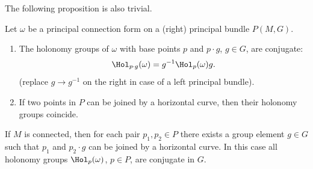 The following proposition is also trivial.
\begin{prop}[{{\cite[Prop.~1.7.8]{RS2}}}]\label{prop 1.7.8 RS2}
    Let $\omega$ be a principal connection form on a (right) principal bundle $P(M,G)$. 
    \begin{enumerate}
        \item The holonomy groups of $\omega$ with base points $p$ and $p\cdot g$, $g\in G$, are conjugate:
        \[\Hol_{p\cdot g}(\omega)=g^{-1}\Hol_{p}(\omega)g.\]
        (replace $g\to g^{-1}$ on the right in case of a left principal bundle).

        \item If two points in $P$ can be joined by a horizontal curve, then their holonomy groups coincide.
    \end{enumerate}
\end{prop}


If $M$ is connected, then for each pair $p_1,p_2\in P$ there exists a group element $g\in G$ such that $p_1$ and $p_2\cdot g$ can be joined by a horizontal curve. In this case all holonomy groups $\Hol_p(\omega)$, $p\in P$, are conjugate in $G$.

